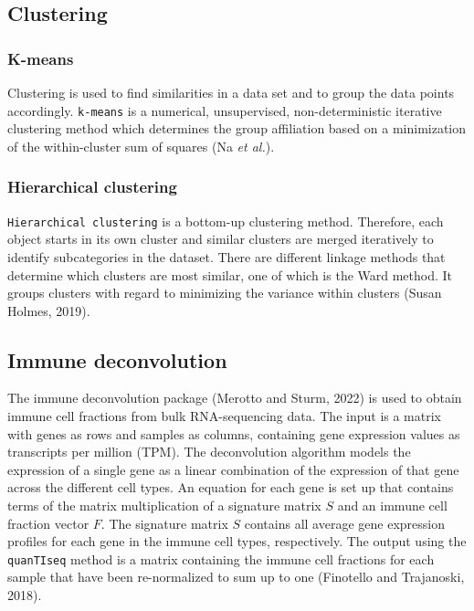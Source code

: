 \documentclass[
  parskip,
  oneside]{scrreprt}
\begin{document}
\hypertarget{clustering}{%
\subsection{Clustering}\label{clustering}}

\hypertarget{k-means}{%
\subsubsection{K-means}\label{k-means}}

Clustering is used to find similarities in a data set and to group the
data points accordingly. \texttt{k-means} is a numerical, unsupervised,
non-deterministic iterative clustering method which determines the group
affiliation based on a minimization of the within-cluster sum of squares
(Na \emph{et al.}).

\hypertarget{hierarchical-clustering}{%
\subsubsection{Hierarchical clustering}\label{hierarchical-clustering}}

\texttt{Hierarchical\ clustering} is a bottom-up clustering method.
Therefore, each object starts in its own cluster and similar clusters
are merged iteratively to identify subcategories in the dataset. There
are different linkage methods that determine which clusters are most
similar, one of which is the Ward method. It groups clusters with regard
to minimizing the variance within clusters (Susan Holmes, 2019).

\hypertarget{immune-deconvolution}{%
\subsection{Immune deconvolution}\label{immune-deconvolution}}

The immune deconvolution package (Merotto and Sturm, 2022) is used to
obtain immune cell fractions from bulk RNA-sequencing data. The input is
a matrix with genes as rows and samples as columns, containing gene
expression values as transcripts per million (TPM). The deconvolution
algorithm models the expression of a single gene as a linear combination
of the expression of that gene across the different cell types. An
equation for each gene is set up that contains terms of the matrix
multiplication of a signature matrix \(S\) and an immune cell fraction
vector \(F\). The signature matrix \(S\) contains all average gene
expression profiles for each gene in the immune cell types,
respectively. The output using the \texttt{quanTIseq} method is a matrix
containing the immune cell fractions for each sample that have been
re-normalized to sum up to one (Finotello and Trajanoski, 2018).
\end{document}
